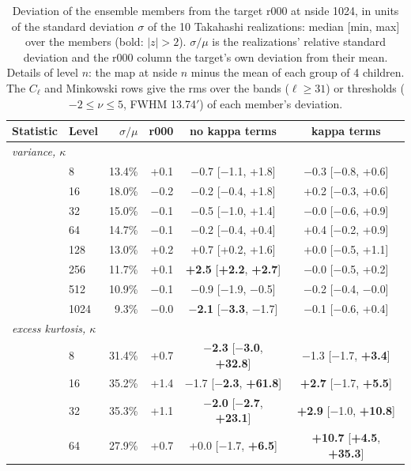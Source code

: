 \begin{table}
\caption{Deviation of the ensemble members from the target r000 at nside 1024, in units of the standard deviation $\sigma$ of the 10 Takahashi realizations: median [min, max] over the members (bold: $|z| > 2$). $\sigma/\mu$ is the realizations' relative standard deviation and the r000 column the target's own deviation from their mean. Details of level $n$: the map at nside $n$ minus the mean of each group of 4 children. The $C_\ell$ and Minkowski rows give the rms over the bands ($\ell \geq 31$) or thresholds ($-2\leq\nu\leq5$, FWHM 13.74$'$) of each member's deviation.}
\label{tab:zscores_n1024}
\centering\small
\begin{tabular}{llrrcc}
\hline\hline
Statistic & Level & $\sigma/\mu$ & r000 & no kappa terms & kappa terms \\
\hline
\multicolumn{6}{l}{\emph{variance, $\kappa$}} \\
 & 8 & 13.4\% & +0.1 & $-$0.7 [$-$1.1, +1.8] & $-$0.3 [$-$0.8, +0.6] \\
 & 16 & 18.0\% & $-$0.2 & $-$0.2 [$-$0.4, +1.8] & +0.2 [$-$0.3, +0.6] \\
 & 32 & 15.0\% & $-$0.1 & $-$0.5 [$-$1.0, +1.4] & $-$0.0 [$-$0.6, +0.9] \\
 & 64 & 14.7\% & $-$0.1 & $-$0.2 [$-$0.4, +0.4] & +0.4 [$-$0.2, +0.9] \\
 & 128 & 13.0\% & +0.2 & +0.7 [+0.2, +1.6] & +0.0 [$-$0.5, +1.1] \\
 & 256 & 11.7\% & +0.1 & \textbf{+2.5} [\textbf{+2.2}, \textbf{+2.7}] & $-$0.0 [$-$0.5, +0.2] \\
 & 512 & 10.9\% & $-$0.1 & $-$0.9 [$-$1.9, $-$0.5] & $-$0.2 [$-$0.4, $-$0.0] \\
 & 1024 & 9.3\% & $-$0.0 & \textbf{$-$2.1} [\textbf{$-$3.3}, $-$1.7] & $-$0.1 [$-$0.6, +0.4] \\
\hline
\multicolumn{6}{l}{\emph{excess kurtosis, $\kappa$}} \\
 & 8 & 31.4\% & +0.7 & \textbf{$-$2.3} [\textbf{$-$3.0}, \textbf{+32.8}] & $-$1.3 [$-$1.7, \textbf{+3.4}] \\
 & 16 & 35.2\% & +1.4 & $-$1.7 [\textbf{$-$2.3}, \textbf{+61.8}] & \textbf{+2.7} [$-$1.7, \textbf{+5.5}] \\
 & 32 & 35.3\% & +1.1 & \textbf{$-$2.0} [\textbf{$-$2.7}, \textbf{+23.1}] & \textbf{+2.9} [$-$1.0, \textbf{+10.8}] \\
 & 64 & 27.9\% & +0.7 & +0.0 [$-$1.7, \textbf{+6.5}] & \textbf{+10.7} [\textbf{+4.5}, \textbf{+35.3}] \\

\end{tabular}
\end{table}
